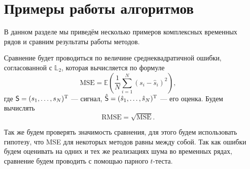 \documentclass[specialist,
               substylefile = spbu.rtx,
               subf,href,colorlinks=true, 12pt]{disser}
\begin{document}
%
%

\section{Примеры работы алгоритмов}
В данном разделе мы приведём несколько примеров комплексных временных рядов и сравним результаты работы методов.

Сравнение будет проводиться по величине среднеквадратичной ошибки, согласованной с $\mathbb{L}_2$, которая вычисляется по формуле
\begin{equation}\label{MSE}
	\text{MSE} = \mathbb{E} \left(\frac{1}{N} \sum \limits_{i=1}^{N}(s_i - \hat s_i )^2 \right),
\end{equation}
где $\textsf{S}=(s_1,\ldots,s_N)^\mathrm{T}$ --- сигнал, $\hat{\textsf{S}}=(\hat{s}_1,\ldots,\hat{s}_N)^\mathrm{T}$ --- его оценка.
Будем вычислять
\begin{equation*}
	\text{RMSE} = \sqrt{\textrm{MSE}}.
\end{equation*}

Так же будем проверять значимость сравнения, для этого будем использовать гипотезу, что MSE для некоторых методов равны между собой. Так как ошибки будем оценивать на одних и тех же реализациях шума во временных рядах, сравнение будем проводить с помощью парного $t$-теста.

\end{document}
